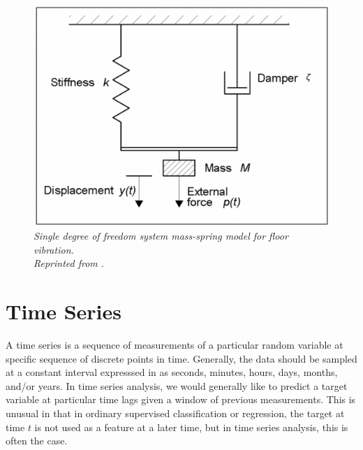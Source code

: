 \begin{figure}[H]
  \centering
  \caption[Single degree of freedom system mass-spring model for floor vibration.]{\emph{Single degree of freedom system mass-spring model for floor vibration. \\ Reprinted from \citeauthor{steelconstruction_2016} \citeyear{steelconstruction_2016}.}  }\label{fig:s_degree}
  \includegraphics[scale = 0.13]{figures/single_degree.jpg}
\end{figure}

\section{Time Series}

A time series is a sequence of measurements of a particular random variable at specific sequence of discrete points in time. Generally, the data should be sampled at a constant interval expresssed in as seconds, minutes, hours, days, months, and/or years. In time series analysis, we would generally like to predict a target variable at particular time lags given a window of previous measurements. This is unusual in that in ordinary supervised classification or regression, the target at time $t$ is not used as a feature at a later time, but in time series analysis, this is often the case.


